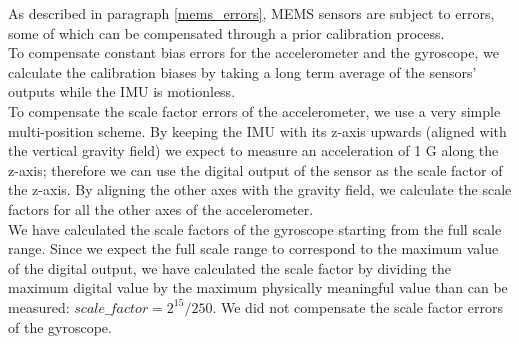 As described in paragraph \ref{mems_errors}, MEMS sensors are subject to errors, some of which can be compensated through a prior calibration process\supercite{imu_calib_01}\supercite{imu_calib_02}.\\

To compensate constant bias errors for the accelerometer and the gyroscope, we calculate the calibration biases by taking a long term average of the sensors' outputs while the IMU is motionless.\\
To compensate the scale factor errors of the accelerometer, we use a very simple multi-position scheme. By keeping the IMU with its z-axis upwards (aligned with the vertical gravity field) we expect to measure an acceleration of 1 G along the z-axis; therefore we can use the digital output of the sensor as the scale factor of the z-axis. By aligning the other axes with the gravity field, we calculate the scale factors for all the other axes of the accelerometer.\\
We have calculated the scale factors of the gyroscope starting from the full scale range. Since we expect the full scale range to correspond to the maximum value of the digital output, we have calculated the scale factor by dividing the maximum digital value by the maximum physically meaningful value than can be measured: $scale\_factor = 2^{15} / 250$. We did not compensate the scale factor errors of the gyroscope.\\

